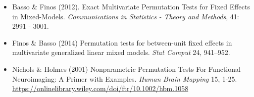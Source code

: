 \documentclass[
]{article}
\begin{document}
\begin{itemize}
\item
  Basso \& Finos (2012). Exact Multivariate Permutation Tests for Fixed
  Effects in Mixed-Models. \emph{Communications in Statistics - Theory
  and Methods}, 41: 2991 - 3001.
\item
  Finos \& Basso (2014) Permutation tests for between-unit fixed effects
  in multivariate generalized linear mixed models. \emph{Stat Comput}
  24, 941--952.
\item
  Nichols \& Holmes (2001) Nonparametric Permutation Tests For
  Functional Neuroimaging: A Primer with Examples. \emph{Human Brain
  Mapping} 15, 1-25.
  \url{https://onlinelibrary.wiley.com/doi/ftr/10.1002/hbm.1058}
\end{itemize}
\end{document}
